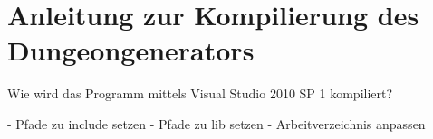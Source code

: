 \chapter{Anleitung zur Kompilierung des Dungeongenerators}

Wie wird das Programm mittels Visual Studio 2010 SP 1 kompiliert?

- Pfade zu include setzen
- Pfade zu lib setzen
- Arbeitverzeichnis anpassen